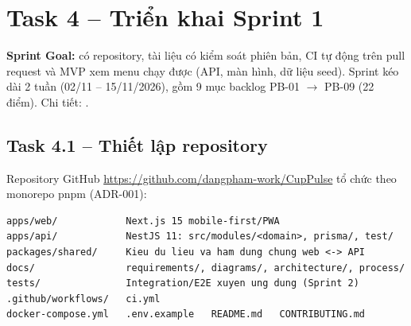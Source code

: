 \section{Task 4 -- Triển khai Sprint 1}\label{sec:sprint1}

\textbf{Sprint Goal:} có repository, tài liệu có kiểm soát phiên bản, CI tự động trên pull request và MVP xem menu
chạy được (API, màn hình, dữ liệu seed). Sprint kéo dài 2 tuần (02/11 -- 15/11/2026), gồm 9 mục backlog PB-01
$\rightarrow$ PB-09 (22 điểm). Chi tiết: .

\subsection{Task 4.1 -- Thiết lập repository}

Repository GitHub \url{https://github.com/dangpham-work/CupPulse} tổ chức theo monorepo pnpm (ADR-001):

\begin{lstlisting}[basicstyle=\ttfamily\footnotesize,frame=single]
apps/web/            Next.js 15 mobile-first/PWA
apps/api/            NestJS 11: src/modules/<domain>, prisma/, test/
packages/shared/     Kieu du lieu va ham dung chung web <-> API
docs/                requirements/, diagrams/, architecture/, process/
tests/               Integration/E2E xuyen ung dung (Sprint 2)
.github/workflows/   ci.yml
docker-compose.yml   .env.example   README.md   CONTRIBUTING.md
\end{lstlisting}

